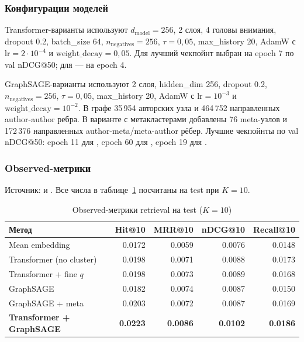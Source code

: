 \subsubsection{Конфигурации моделей}

Transformer-варианты используют $d_{\mathrm{model}} = 256$, 2 слоя, 4 головы внимания, dropout 0.2,
batch\_size 64, $n_{\mathrm{negatives}} = 256$, $\tau = 0{,}05$, max\_history 20, AdamW с
$\mathrm{lr}=2\cdot10^{-4}$ и $\mathrm{weight\_decay}=0{,}05$. Для 
лучший чекпойнт выбран на epoch 7 по val nDCG@50; для  —
на epoch 4.

GraphSAGE-варианты используют 2 слоя, hidden\_dim 256, dropout 0.2, $n_{\mathrm{negatives}} = 256$,
$\tau = 0{,}05$, max\_history 20, AdamW с $\mathrm{lr}=10^{-3}$ и
$\mathrm{weight\_decay}=10^{-2}$. В графе 35\,954 авторских узла и 464\,752 направленных
author-author ребра. В варианте с метакластерами добавлены 76 meta-узлов и 172\,376 направленных
author-meta/meta-author рёбер. Лучшие чекпойнты по val nDCG@50: epoch 11 для
, epoch 60 для , epoch 19 для
.

\subsubsection{Observed-метрики}

Источник:  и
. Все числа в таблице~\ref{tab:retrieval-observed}
посчитаны на test при $K = 10$.

\begin{table}[ht]
\caption{Observed-метрики retrieval на test ($K = 10$)}
\label{tab:retrieval-observed}
\centering
\footnotesize
\setlength{\tabcolsep}{4pt}
\begin{tabular}{lrrrr}
\toprule
Метод & Hit@10 & MRR@10 & nDCG@10 & Recall@10 \\
\midrule
Mean embedding & 0.0172 & 0.0059 & 0.0076 & 0.0148 \\
Transformer (no cluster) & 0.0198 & 0.0071 & 0.0088 & 0.0173 \\
Transformer + fine $q$ & 0.0198 & 0.0073 & 0.0089 & 0.0168 \\
GraphSAGE & 0.0182 & 0.0074 & 0.0087 & 0.0150 \\
GraphSAGE + meta & 0.0203 & 0.0072 & 0.0087 & 0.0169 \\
\textbf{Transformer + GraphSAGE} & \textbf{0.0223} & \textbf{0.0086} & \textbf{0.0102} & \textbf{0.0186} \\
\bottomrule
\end{tabular}
\end{table}

